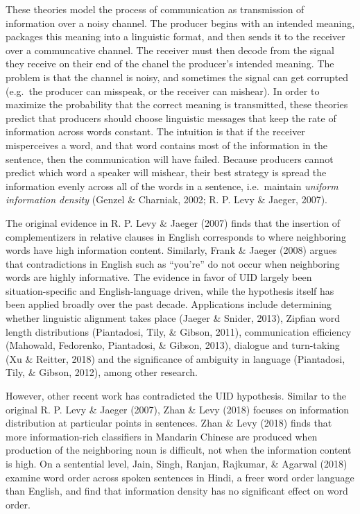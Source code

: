 \documentclass[10pt, letterpaper]{article}
\begin{document}
These theories model the process of communication as transmission of
information over a noisy channel. The producer begins with an intended
meaning, packages this meaning into a linguistic format, and then sends
it to the receiver over a communcative channel. The receiver must then
decode from the signal they receive on their end of the chanel the
producer's intended meaning. The problem is that the channel is noisy,
and sometimes the signal can get corrupted (e.g.~the producer can
misspeak, or the receiver can mishear). In order to maximize the
probability that the correct meaning is transmitted, these theories
predict that producers should choose linguistic messages that keep the
rate of information across words constant. The intuition is that if the
receiver misperceives a word, and that word contains most of the
information in the sentence, then the communication will have failed.
Because producers cannot predict which word a speaker will mishear,
their best strategy is spread the information evenly across all of the
words in a sentence, i.e.~maintain \emph{uniform information density}
(Genzel \& Charniak, 2002; R. P. Levy \& Jaeger, 2007).

The original evidence in R. P. Levy \& Jaeger (2007) finds that the
insertion of complementizers in relative clauses in English corresponds
to where neighboring words have high information content. Similarly,
Frank \& Jaeger (2008) argues that contradictions in English such as
``you're'' do not occur when neighboring words are highly informative.
The evidence in favor of UID largely been situation-specific and
English-language driven, while the hypothesis itself has been applied
broadly over the past decade. Applications include determining whether
linguistic alignment takes place (Jaeger \& Snider, 2013), Zipfian word
length distributions (Piantadosi, Tily, \& Gibson, 2011), communication
efficiency (Mahowald, Fedorenko, Piantadosi, \& Gibson, 2013), dialogue
and turn-taking (Xu \& Reitter, 2018) and the significance of ambiguity
in language (Piantadosi, Tily, \& Gibson, 2012), among other research.

However, other recent work has contradicted the UID hypothesis. Similar
to the original R. P. Levy \& Jaeger (2007), Zhan \& Levy (2018) focuses
on information distribution at particular points in sentences. Zhan \&
Levy (2018) finds that more information-rich classifiers in Mandarin
Chinese are produced when production of the neighboring noun is
difficult, not when the information content is high. On a sentential
level, Jain, Singh, Ranjan, Rajkumar, \& Agarwal (2018) examine word
order across spoken sentences in Hindi, a freer word order language than
English, and find that information density has no significant effect on
word order.
\end{document}
